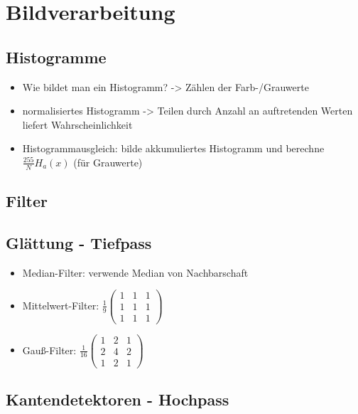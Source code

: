 \documentclass[paper=a4, fontsize=11pt]{scrartcl} %
\numberwithin{equation}{section} %
\numberwithin{figure}{section} %
\numberwithin{table}{section} %
\begin{document}
\section{Bildverarbeitung}

\subsection{Histogramme}

\begin{itemize}
\item Wie bildet man ein Histogramm? -> Zählen der Farb-/Grauwerte
\item normalisiertes Histogramm -> Teilen durch Anzahl an auftretenden Werten liefert Wahrscheinlichkeit
\item Histogrammausgleich: bilde akkumuliertes Histogramm und berechne $\frac{255}{N} H_a(x)$ (für Grauwerte)
\end{itemize}

\subsection{Filter}

\subsection{Glättung - Tiefpass}

\begin{itemize}
\item Median-Filter: verwende Median von Nachbarschaft
\item Mittelwert-Filter: $ \frac{1}{9} \begin{pmatrix} 1 & 1 & 1\\ 1 & 1 & 1\\ 1 & 1 & 1 \end{pmatrix}$
\item Gauß-Filter: $ \frac{1}{16} \begin{pmatrix} 1 & 2 & 1\\ 2 & 4 & 2\\ 1 & 2 & 1 \end{pmatrix}$
\end{itemize}

\subsection{Kantendetektoren - Hochpass}
\end{document}
